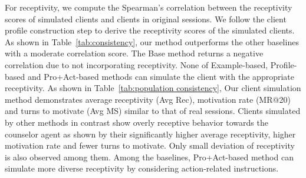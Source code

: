 For receptivity, we compute the Spearman's correlation between the receptivity scores of simulated clients and clients in original sessions. We follow the client profile construction step to derive the receptivity scores of the simulated clients. As shown in Table~\ref{tab:consistency}, our method outperforms the other baselines with a moderate correlation score. The Base method returns a negative correlation due to not incorporating receptivity. None of Example-based, Profile-based and Pro+Act-based methods can simulate the client with the appropriate receptivity. As shown in Table~\ref{tab:population consistency}, Our client simulation method demonstrates average receptivity (Avg Rec), motivation rate (MR@20) and turns to motivate (Avg MS) similar to that of real sessions.  Clients simulated by other methods in contrast show overly receptive behavior towards the counselor agent as shown by their significantly higher average receptivity, higher motivation rate and fewer turns to motivate.  Only small deviation of receptivity is also observed among them. Among the baselines, Pro+Act-based method can simulate more diverse receptivity by considering action-related instructions.  

